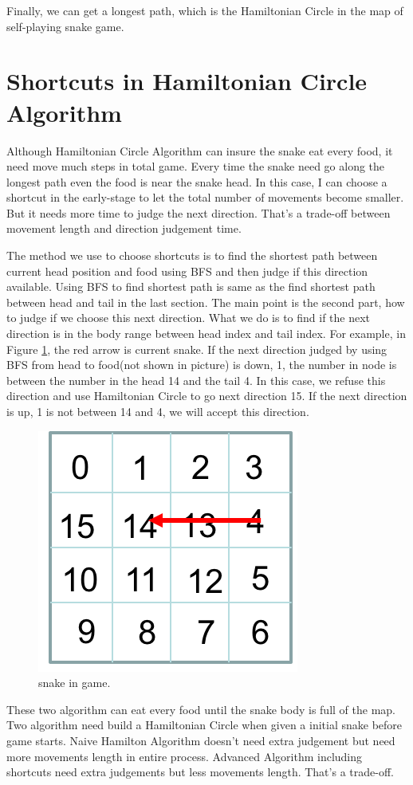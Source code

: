 \documentclass[12pt]{article}
\begin{document}
Finally, we can get a longest path, which is the Hamiltonian Circle in the map of self-playing snake game.

\section{Shortcuts in Hamiltonian Circle Algorithm}

Although Hamiltonian Circle Algorithm can insure the snake eat every food, it need move much steps in total game. Every time the snake need go along the longest path even the food is near the snake head. In this case, I can choose a shortcut in the early-stage to let the total number of movements become smaller. But it needs more time to judge the next direction. That's a trade-off between movement length and direction judgement time. 

The method we use to choose shortcuts is to find the shortest path between current head position and food using BFS and then judge if this direction available. Using BFS to find shortest path is same as the find shortest path between head and tail in the last section. The main point is the second part, how to judge if we choose this next direction. What we do is to find if the next direction is in the body range between head index and tail index. For example, in Figure \ref{fig:figure4label}, the red arrow is current snake. If the next direction judged by using BFS from head to food(not shown in picture) is down, 1, the number in node is  between the number in the head 14 and the tail 4. In this case, we refuse this direction and use Hamiltonian Circle to go next direction 15. If the next direction is up, 1 is not between 14 and 4, we will accept this direction.  

\begin{figure}[H]
\centering 
\includegraphics[scale = 0.8]{Picture3.png}
\caption{snake in game.}
\label{fig:figure4label}
\end{figure}

These two algorithm can eat every food until the snake body is full of the map. Two algorithm need build a Hamiltonian Circle when given a initial snake before game starts. Naive Hamilton Algorithm doesn't need extra judgement but need more movements length in entire process. Advanced Algorithm including shortcuts need extra judgements but less movements length. That's a trade-off.
\end{document}
